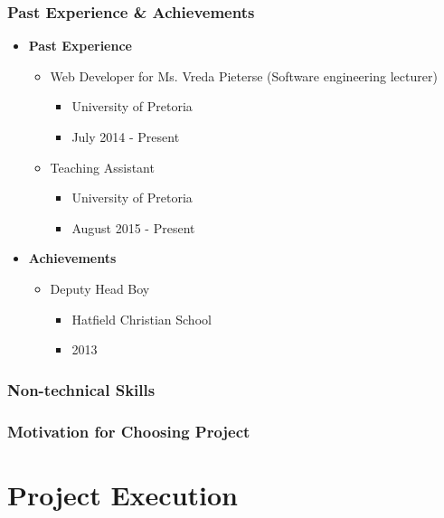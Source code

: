 \documentclass{article}
\begin{document}
		\subsubsection{Past Experience \& Achievements}
		\begin{itemize}
			\item \textbf{Past Experience}
			\begin{itemize}
				\item Web Developer for Ms. Vreda Pieterse (Software engineering lecturer)
				\begin{itemize}
					\item University of Pretoria
					\item July 2014 - Present
				\end{itemize}
				\item Teaching Assistant
				\begin{itemize}
					\item University of Pretoria
					\item August 2015 - Present
				\end{itemize}
			\end{itemize}
			
			\item \textbf{Achievements}
			\begin{itemize}
				\item Deputy Head Boy
				\begin{itemize}
					\item Hatfield Christian School
					\item 2013
				\end{itemize}
			\end{itemize}
		\end{itemize}
		
		\subsubsection{Non-technical Skills}
		\subsubsection{Motivation for Choosing Project}

\cleardoublepage
    
\section{Project Execution}
\end{document}
